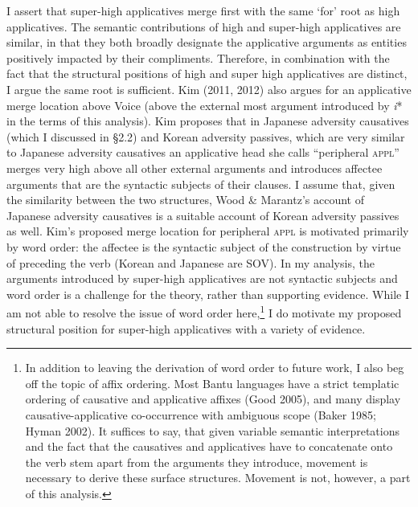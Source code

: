 \documentclass[12pt]{article}
\newenvironment{styleDefault}{\renewcommand\baselinestretch{1.0}\setlength\leftskip{0cm}\setlength\rightskip{0cm plus 1fil}\setlength\parindent{0cm}\setlength\parfillskip{0pt plus 1fil}\setlength\parskip{0in plus 1pt}\writerlistparindent\writerlistleftskip\leavevmode\normalfont\normalsize\writerlistlabel\ignorespaces}{\unskip\vspace{0in plus 1pt}\par}
\newcommand\writerlistleftskip{}
\newcommand\writerlistparindent{}
\newcommand\writerlistlabel{}
\begin{document}
\begin{styleDefault}
I assert that super-high applicatives merge first with the same ‘for’ root as high applicatives. The semantic contributions of high and super-high applicatives are similar, in that they both broadly designate the applicative arguments as entities positively impacted by their compliments. Therefore, in combination with the fact that the structural positions of high and super high applicatives are distinct, I argue the same root is sufficient.\newline
\newline
Kim (2011, 2012) also argues for an applicative merge location above Voice (above the external most argument introduced by \textit{i}* in the terms of this analysis). Kim proposes that in Japanese adversity causatives (which I discussed in §2.2) and Korean adversity passives, which are very similar to Japanese adversity causatives an applicative head she calls “peripheral \textsc{appl}” merges very high above all other external arguments and introduces affectee arguments that are the syntactic subjects of their clauses. I assume that, given the similarity between the two structures, Wood \& Marantz’s account of Japanese adversity causatives is a suitable account of Korean adversity passives as well. Kim’s proposed merge location for peripheral \textsc{appl} is motivated primarily by word order: the affectee is the syntactic subject of the construction by virtue of preceding the verb (Korean and Japanese are SOV). In my analysis, the arguments introduced by super-high applicatives are not syntactic subjects and word order is a challenge for the theory, rather than supporting evidence. While I am not able to resolve the issue of word order here,\footnote{ In addition to leaving the derivation of word order to future work, I also beg off the topic of affix ordering. Most Bantu languages have a strict templatic ordering of causative and applicative affixes (Good 2005), and many display causative-applicative co-occurrence with ambiguous scope (Baker 1985; Hyman 2002). It suffices to say, that given variable semantic interpretations and the fact that the causatives and applicatives have to concatenate onto the verb stem apart from the arguments they introduce, movement is necessary to derive these surface structures. Movement is not, however, a part of this analysis. } I do motivate my proposed structural position for super-high applicatives with a variety of evidence. 
\end{styleDefault}
\end{document}
